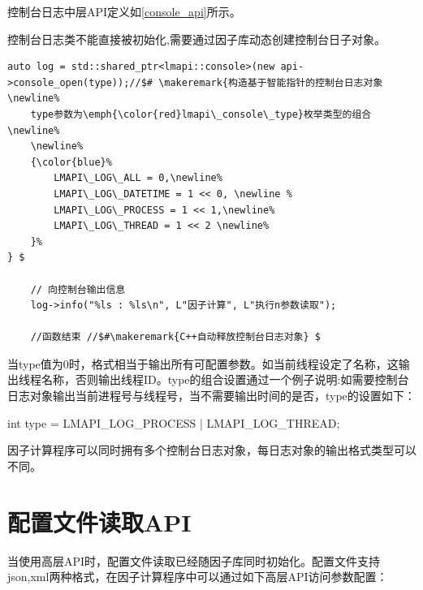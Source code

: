 \highlevelapiend

控制台日志中层API定义如\ref{console_api}所示。



控制台日志类不能直接被初始化,需要通过因子库动态创建控制台日子对象。\\

\begin{lstlisting}[caption=中层API接口加智能指针]
    auto log = std::shared_ptr<lmapi::console>(new api->console_open(type));//$# \makeremark{构造基于智能指针的控制台日志对象\newline%
    type参数为\emph{\color{red}lmapi\_console\_type}枚举类型的组合\newline%
    \newline%
    {\color{blue}%
        LMAPI\_LOG\_ALL = 0,\newline%
        LMAPI\_LOG\_DATETIME = 1 << 0, \newline %
        LMAPI\_LOG\_PROCESS = 1 << 1,\newline%
        LMAPI\_LOG\_THREAD = 1 << 2 \newline%
    }%
} $

    // 向控制台输出信息
    log->info("%ls : %ls\n", L"因子计算", L"执行n参数读取");

    //函数结束 //$#\makeremark{C++自动释放控制台日志对象} $
\end{lstlisting}
\showremarks

当type值为0时，格式相当于输出所有可配置参数。如当前线程设定了名称，这输出线程名称，否则输出线程ID。type的组合设置通过一个例子说明:如需要控制台日志对象输出当前进程号与线程号，当不需要输出时间的是否，type的设置如下：\\

\begin{minipage}{0.8\linewidth}
\centering
{\color{red} int \color{black} type = \color{blue}LMAPI\_LOG\_PROCESS | LMAPI\_LOG\_THREAD};\newline

\end{minipage}

因子计算程序可以同时拥有多个控制台日志对象，每日志对象的输出格式类型可以不同。

\section{配置文件读取API}
当使用高层API时，配置文件读取已经随因子库同时初始化。配置文件支持json,xml两种格式，在因子计算程序中可以通过如下高层API访问参数配置：

